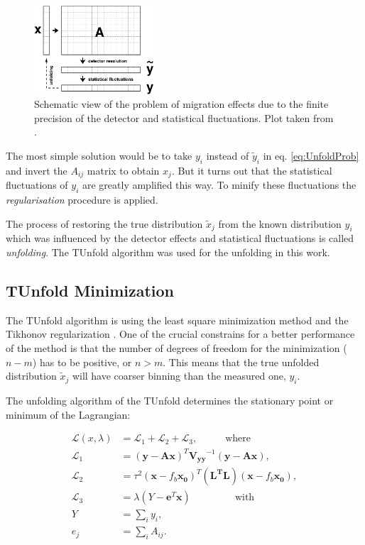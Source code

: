 \begin{figure}[t]
  \centering
  \includegraphics[width=0.4\textwidth]{06_DiffXsec/plots/d12-129f1.png}
  \caption{Schematic view of the problem of migration effects due to the finite precision of the detector and statistical 
  fluctuations. Plot taken from \cite{Schmitt:2012kp}.}
  \label{fig:scUnf}
\end{figure}

The most simple solution would be to take $y_{i}$ instead of $\tilde{y}_{i}$ in eq. \ref{eq:UnfoldProb} and invert
the $A_{ij}$ matrix to obtain $x_{j}$. But it turns out that the statistical fluctuations of $y_{i}$ are greatly 
amplified this way. To minify these fluctuations the \textit{regularisation} procedure is applied.

The process of restoring the true distribution $\tilde{x}_{j}$ from the known distribution $y_{i}$ which was influenced
by the detector effects and statistical fluctuations is called \textit{unfolding}. The TUnfold \cite{Schmitt:2012kp} algorithm was used for the
unfolding in this work.

\subsection{TUnfold Minimization}

The TUnfold algorithm is using the least square minimization method and the Tikhonov regularization \cite{Tikhonov:1963}. One of the crucial 
constrains for a better performance of the method is that the number of degrees of freedom for the minimization ($n - m$) has to be positive,
or $n > m$. This means that the true unfolded distribution $\tilde{x}_j$ will have coarser binning than the measured one, $y_{i}$.

The unfolding algorithm of the TUnfold determines the stationary point or minimum of the Lagrangian:

\begin{align}
 \mathcal{L}(x, \lambda) & = \mathcal{L}_{1} + \mathcal{L}_{2} + \mathcal{L}_{3}, \;\;\;\;\;\;\;\;\;\; \textrm{where}\\
 \mathcal{L}_{1} & = (\mathbf{y} - \mathbf{A}\mathbf{x})^{T} \mathbf{V_{yy}}^{-1}(\mathbf{y} - \mathbf{A}\mathbf{x}),\\
 \mathcal{L}_{2} & = \tau^{2}(\mathbf{x} - f_{b}\mathbf{x_{0}})^{T} (\mathbf{L^{T}L}) (\mathbf{x} - f_{b}\mathbf{x_{0}}), \\
 \mathcal{L}_{3} & = \lambda(Y -\mathbf{e}^{T}\mathbf{x}) \;\;\;\;\;\;\;\;\;\;\;\;\;\;\;\; \textrm{with} \\
 Y & = \sum_{i} y_{i}, \\
 e_{j} & = \sum_{i} A_{ij}.
\end{align}

